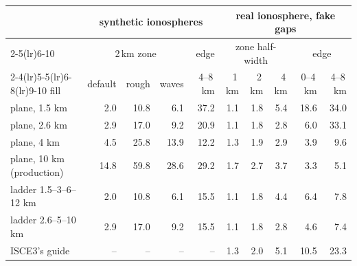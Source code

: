 \begin{tabular}{lrrrrrrrrr}
\toprule
 & \multicolumn{4}{c}{synthetic ionospheres} & \multicolumn{5}{c}{real ionosphere, fake gaps} \\
\cmidrule(lr){2-5}\cmidrule(lr){6-10}
 & \multicolumn{3}{c}{2\,km zone} & edge & \multicolumn{3}{c}{zone half-width} & \multicolumn{2}{c}{edge} \\
\cmidrule(lr){2-4}\cmidrule(lr){5-5}\cmidrule(lr){6-8}\cmidrule(lr){9-10}
fill & default & rough & waves & 4--8\,km & 1\,km & 2\,km & 4\,km & 0--4\,km & 4--8\,km \\
\midrule
plane, 1.5 km & 2.0 & 10.8 & 6.1 & 37.2 & 1.1 & 1.8 & 5.4 & 18.6 & 34.0 \\
plane, 2.6 km & 2.9 & 17.0 & 9.2 & 20.9 & 1.1 & 1.8 & 2.8 & 6.0 & 33.1 \\
plane, 4 km & 4.5 & 25.8 & 13.9 & 12.2 & 1.3 & 1.9 & 2.9 & 3.9 & 9.6 \\
plane, 10 km (production) & 14.8 & 59.8 & 28.6 & 29.2 & 1.7 & 2.7 & 3.7 & 3.3 & 5.1 \\
ladder 1.5--3--6--12 km & 2.0 & 10.8 & 6.1 & 15.5 & 1.1 & 1.8 & 4.4 & 6.4 & 7.8 \\
ladder 2.6--5--10 km & 2.9 & 17.0 & 9.2 & 15.5 & 1.1 & 1.8 & 2.8 & 4.6 & 7.4 \\
ISCE3's guide & -- & -- & -- & -- & 1.3 & 2.0 & 5.1 & 10.5 & 23.3 \\
\bottomrule
\end{tabular}
